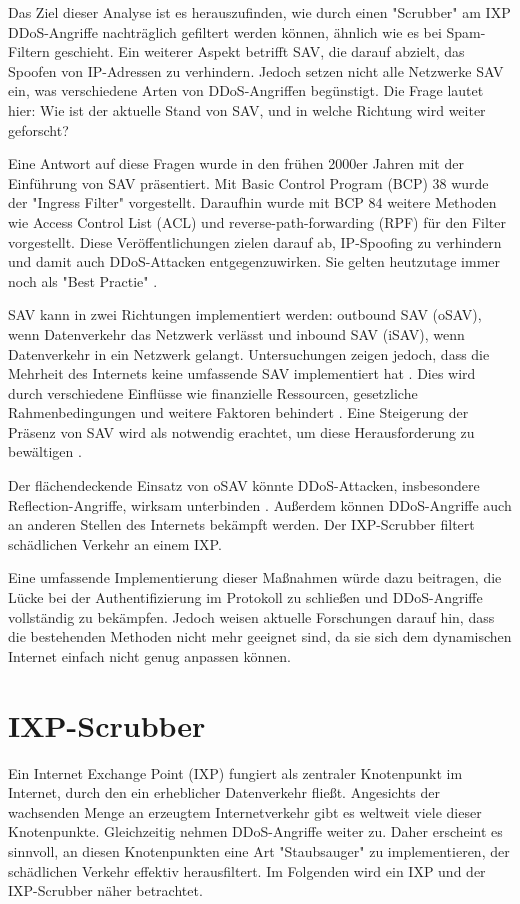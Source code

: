 \documentclass[sigplan,screen]{acmart}
\begin{document}
Das Ziel dieser Analyse ist es herauszufinden, wie durch einen "Scrubber" am IXP DDoS-Angriffe nachträglich gefiltert werden können, ähnlich wie es bei Spam-Filtern geschieht. Ein weiterer Aspekt betrifft SAV, die darauf abzielt, das Spoofen von IP-Adressen zu verhindern. Jedoch setzen nicht alle Netzwerke SAV ein, was verschiedene Arten von DDoS-Angriffen begünstigt. Die Frage lautet hier: Wie ist der aktuelle Stand von SAV, und in welche Richtung wird weiter geforscht?

Eine Antwort auf diese Fragen wurde in den frühen 2000er Jahren mit der Einführung von SAV präsentiert. Mit Basic Control Program (BCP) 38 \cite{Ingress01} wurde der "Ingress Filter" vorgestellt. Daraufhin wurde mit BCP 84 \cite{Bcp84} weitere Methoden wie Access Control List (ACL) und reverse-path-forwarding (RPF) für den Filter vorgestellt. Diese Veröffentlichungen zielen darauf ab, IP-Spoofing zu verhindern und damit auch DDoS-Attacken entgegenzuwirken. Sie gelten heutzutage immer noch als "Best Practie" \cite{Hal01}. 

SAV kann in zwei Richtungen implementiert werden: outbound SAV (oSAV), wenn Datenverkehr das Netzwerk verlässt und inbound SAV (iSAV), wenn Datenverkehr in ein Netzwerk gelangt. Untersuchungen zeigen jedoch, dass die Mehrheit des Internets keine umfassende SAV implementiert hat \cite{Spoofer01} \cite{CRP01}. Dies wird durch verschiedene Einflüsse wie finanzielle Ressourcen, gesetzliche Rahmenbedingungen und weitere Faktoren behindert \cite{Hal01}. Eine Steigerung der Präsenz von SAV wird als notwendig erachtet, um diese Herausforderung zu bewältigen \cite{manrs01}.

Der flächendeckende Einsatz von oSAV könnte DDoS-Attacken, insbesondere Reflection-Angriffe, wirksam unterbinden \cite{FrontDoor01}. Außerdem können DDoS-Angriffe auch an anderen Stellen des Internets bekämpft werden. Der IXP-Scrubber \cite{Hohlfeld01} filtert schädlichen Verkehr an einem IXP.

Eine umfassende Implementierung dieser Maßnahmen würde dazu beitragen, die Lücke bei der Authentifizierung im Protokoll zu schließen und DDoS-Angriffe vollständig zu bekämpfen. Jedoch weisen aktuelle Forschungen darauf hin, dass die bestehenden Methoden nicht mehr geeignet sind, da sie sich dem dynamischen Internet einfach nicht genug anpassen können.

\section{IXP-Scrubber}
Ein Internet Exchange Point (IXP) fungiert als zentraler Knotenpunkt im Internet, durch den ein erheblicher Datenverkehr fließt. Angesichts der wachsenden Menge an erzeugtem Internetverkehr gibt es weltweit viele dieser Knotenpunkte. Gleichzeitig nehmen DDoS-Angriffe weiter zu. Daher erscheint es sinnvoll, an diesen Knotenpunkten eine Art "Staubsauger" zu implementieren, der schädlichen Verkehr effektiv herausfiltert. Im Folgenden wird ein IXP und der IXP-Scrubber näher betrachtet.
\end{document}

